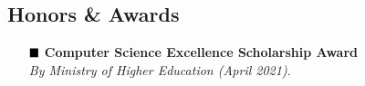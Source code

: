 \documentclass{article}
\begin{document}
\begin{titlepage}
		\section{Honors \& Awards}
		\begin{enumerate}[leftmargin=1.8cm]
				\scriptsize\selectfont \item[$\scriptsize \blacksquare$] \Large\selectfont \textbf{Computer Science Excellence Scholarship Award } \\  \emph{By Ministry of Higher Education (April 2021).}
			\end{enumerate}
	\end{titlepage}
	\restoregeometry
\end{document}
